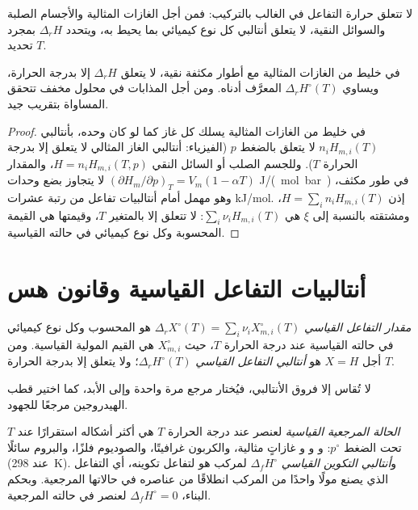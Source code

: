 لا تتعلق حرارة التفاعل في الغالب بالتركيب: فمن أجل الغازات المثالية
والأجسام الصلبة والسوائل النقية، لا يتعلق أنتالبي كل نوع كيميائي بما
يحيط به، ويتحدد $\Delta_r H$ بمجرد تحديد $T$.

\begin{proposition}\label{prop:b2:reaction-enthalpy:ideal}
في خليط من الغازات المثالية مع أطوار مكثفة نقية، لا يتعلق $\Delta_r H$
إلا بدرجة الحرارة، ويساوي  $\Delta_r H^\circ(T)$
المعرَّف أدناه. ومن أجل المذابات في محلول مخفف تتحقق المساواة بتقريب
جيد.
\end{proposition}

\begin{proof}
في خليط من الغازات المثالية يسلك كل غاز كما لو كان وحده، بأنتالبي
$n_iH_{m,i}(T)$ لا يتعلق بالضغط $p$ (الفيزياء: أنتالبي الغاز المثالي لا
يتعلق إلا بدرجة الحرارة $T$). وللجسم الصلب أو السائل النقي $H = n_iH_{m,i}(T,
p)$، والمقدار $(\partial H_m/\partial p)_T = V_m(1 - \alpha T)$ لا يتجاوز بضع
وحدات \unit{J/(mol.bar)} في طور مكثف، وهو مهمل أمام أنتالبيات تفاعل من
رتبة عشرات \unit{kJ/mol}. إذن $H = \sum_in_iH_{m,i}(T)$، ومشتقته بالنسبة
إلى $\xi$ هي $\sum_i\nu_iH_{m,i}(T)$: لا تتعلق إلا بالمتغير
$T$، وقيمتها هي القيمة المحسوبة وكل نوع كيميائي في حالته القياسية.
\end{proof}

\section{أنتالبيات التفاعل القياسية وقانون هس}

\begin{definition}\label{def:b2:reaction-enthalpy:standard-reaction-enthalpy}
\emph{مقدار التفاعل القياسي}
$\Delta_r X^\circ(T) = \sum_i\nu_iX_{m,i}^\circ(T)$ هو  المحسوب
وكل نوع كيميائي في حالته القياسية عند درجة الحرارة $T$، حيث
$X_{m,i}^\circ$ هي القيم المولية القياسية. ومن أجل $X = H$ هو
\emph{أنتالبي التفاعل القياسي}
$\Delta_r H^\circ(T)$؛ ولا يتعلق إلا بدرجة الحرارة $T$.
\end{definition}

لا تُقاس إلا فروق الأنتالبي، فيُختار مرجع مرة واحدة وإلى الأبد، كما
اختير قطب الهيدروجين مرجعًا للجهود.

\begin{definition}\label{def:b2:reaction-enthalpy:formation}
\emph{الحالة المرجعية القياسية} لعنصر عند درجة
الحرارة $T$ هي أكثر أشكاله استقرارًا عند $T$ تحت الضغط $p^\circ$:
 و و و غازاتٍ مثالية، والكربون غرافيتًا،
والصوديوم فلزًا، والبروم سائلًا (عند \qty{298}{K}).
و\emph{أنتالبي التكوين القياسي}
$\Delta_f H^\circ$ لمركب هو  لتفاعل تكوينه، أي
التفاعل الذي يصنع مولًا واحدًا من المركب انطلاقًا من عناصره في حالاتها
المرجعية. وبحكم البناء، $\Delta_f H^\circ = 0$ لعنصر في حالته المرجعية.
\end{definition}

